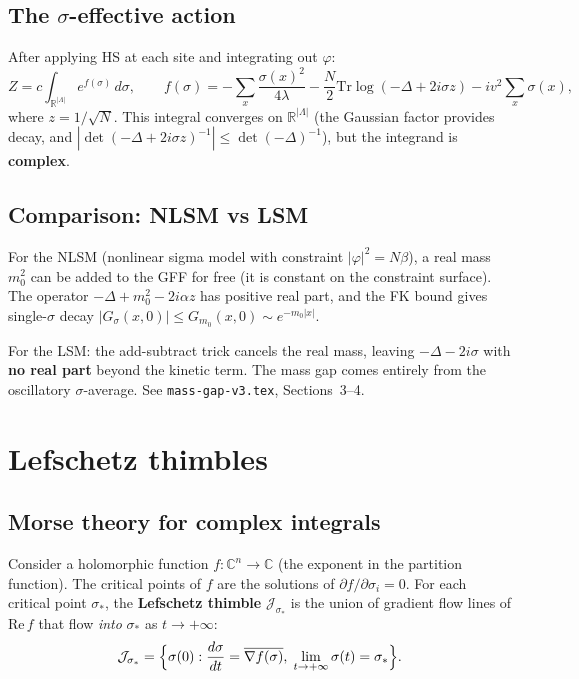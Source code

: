 \documentclass[12pt]{article}
\theoremstyle{definition}
\theoremstyle{remark}
\newcommand{\R}{\mathbb{R}}
\newcommand{\C}{\mathbb{C}}
\newcommand{\Tr}{\mathrm{Tr}}
\newcommand{\ph}{\varphi}
\newcommand{\La}{\Lambda}
\newcommand{\re}{\mathrm{Re}}
\begin{document}
\subsection{The $\sigma$-effective action}

After applying HS at each site and integrating out $\ph$:
\begin{equation}\label{eq:f}
  Z = c\int_{\R^{|\La|}} e^{f(\sigma)}\,d\sigma, \qquad
  f(\sigma) = -\sum_x\frac{\sigma(x)^2}{4\lambda}
    - \frac{N}{2}\Tr\log(-\Delta+2i\sigma z)
    - iv^2\sum_x\sigma(x),
\end{equation}
where $z = 1/\sqrt{N}$. This integral converges on $\R^{|\La|}$ (the
Gaussian factor provides decay, and $|\det(-\Delta+2i\sigma z)^{-1}|
\le \det(-\Delta)^{-1}$), but the integrand is \textbf{complex}.

\subsection{Comparison: NLSM vs LSM}

For the NLSM (nonlinear sigma model with constraint $|\ph|^2 = N\beta$),
a real mass $m_0^2$ can be added to the GFF for free (it is constant
on the constraint surface). The operator $-\Delta + m_0^2 - 2i\alpha z$
has positive real part, and the FK bound gives single-$\sigma$ decay
$|G_\sigma(x,0)| \le G_{m_0}(x,0) \sim e^{-m_0|x|}$.

For the LSM: the add-subtract trick cancels the real mass, leaving
$-\Delta - 2i\sigma$ with \textbf{no real part} beyond the kinetic
term. The mass gap comes entirely from the oscillatory
$\sigma$-average. See \texttt{mass-gap-v3.tex}, Sections~3--4.

\section{Lefschetz thimbles}

\subsection{Morse theory for complex integrals}

Consider a holomorphic function $f : \C^n \to \C$ (the exponent
in the partition function). The critical points of $f$ are the
solutions of $\partial f/\partial\sigma_i = 0$. For each critical
point $\sigma_*$, the \textbf{Lefschetz thimble} $\mathcal{J}_{\sigma_*}$
is the union of gradient flow lines of $\re\,f$ that flow \emph{into}
$\sigma_*$ as $t \to +\infty$:
\begin{equation}
  \mathcal{J}_{\sigma_*} = \Bigl\{\sigma(0) :
    \frac{d\sigma}{dt} = \overline{\nabla f(\sigma)},\;
    \lim_{t\to+\infty}\sigma(t) = \sigma_*\Bigr\}.
\end{equation}
\end{document}
